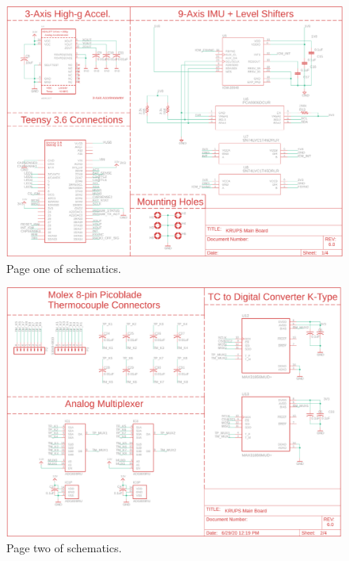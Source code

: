 \documentclass{article}
\begin{document}
\begin{figure}[H]
    \centering
    \includegraphics[width=\textwidth]{images/page1.png}
    \caption{Page one of schematics.}
    \label{fig:page1_2}
\end{figure}

\begin{figure}[H]
    \centering
    \includegraphics[width=\textwidth]{images/page2.png}
    \caption{Page two of schematics.}
    \label{fig:page1_1}
\end{figure}
\end{document}
